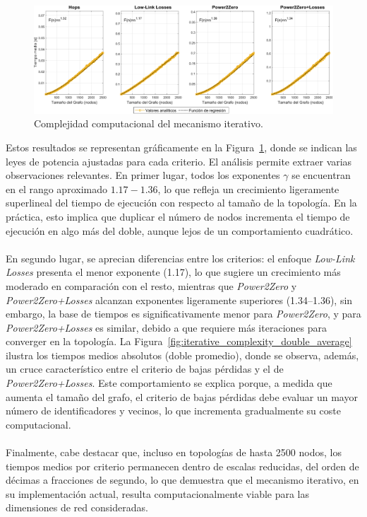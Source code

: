 \begin{figure}[ht!]
    \centering
    \includegraphics[width=\textwidth]{fig/07_bloste/bloste_25.pdf}
    \caption{Complejidad computacional del mecanismo iterativo.}
    \label{fig:iterative_regressions_4criteria}
\end{figure}

Estos resultados se representan gráficamente en la Figura~\ref{fig:iterative_regressions_4criteria}, donde se indican las leyes de potencia ajustadas para cada criterio. El análisis permite extraer varias observaciones relevantes. En primer lugar, todos los exponentes \(\gamma\) se encuentran en el rango aproximado \(1.17\!-\!1.36\), lo que refleja un crecimiento ligeramente superlineal del tiempo de ejecución con respecto al tamaño de la topología. En la práctica, esto implica que duplicar el número de nodos incrementa el tiempo de ejecución en algo más del doble, aunque lejos de un comportamiento cuadrático.\\
\\
En segundo lugar, se aprecian diferencias entre los criterios: el enfoque \textit{Low-Link Losses} presenta el menor exponente (1.17), lo que sugiere un crecimiento más moderado en comparación con el resto, mientras que \textit{Power2Zero} y \textit{Power2Zero+Losses} alcanzan exponentes ligeramente superiores (1.34–1.36), sin embargo, la base de tiempos es significativamente menor para \textit{Power2Zero}, y para \textit{Power2Zero+Losses} es similar, debido a que requiere más iteraciones para converger en la topología. La Figura~\ref{fig:iterative_complexity_double_average} ilustra los tiempos medios absolutos (doble promedio), donde se observa, además, un cruce característico entre el criterio de bajas pérdidas y el de \textit{Power2Zero+Losses}. Este comportamiento se explica porque, a medida que aumenta el tamaño del grafo, el criterio de bajas pérdidas debe evaluar un mayor número de identificadores y vecinos, lo que incrementa gradualmente su coste computacional. \\
\\
Finalmente, cabe destacar que, incluso en topologías de hasta 2500 nodos, los tiempos medios por criterio permanecen dentro de escalas reducidas, del orden de décimas a fracciones de segundo, lo que demuestra que el mecanismo iterativo, en su implementación actual, resulta computacionalmente viable para las dimensiones de red consideradas.



